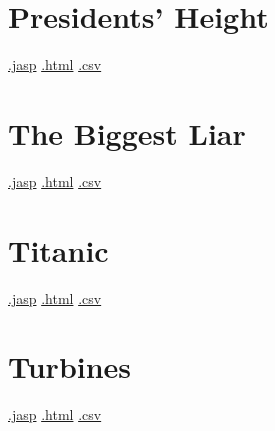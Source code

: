 \documentclass[
  letterpaper,
  DIV=11,
  numbers=noendperiod]{scrreprt}
\begin{document}
\hypertarget{presidents-height}{%
\section{Presidents' Height}\label{presidents-height}}

\textbar{}
\href{https://github.com/jasp-stats/jasp-data-library/raw/main/Presidents\textquotesingle{}\%20Height/Presidents\textquotesingle{}\%20Height.jasp}{.jasp}
\textbar{}
\href{https://htmlpreview.github.io/?https://github.com/jasp-stats/jasp-data-library/blob/main/Presidents\textquotesingle{}\%20Height/index.html}{.html}
\textbar{}
\href{https://raw.githubusercontent.com/jasp-stats/jasp-data-library/main/Presidents\textquotesingle{}\%20Height/Presidents\textquotesingle{}\%20Height.csv}{.csv}

\hypertarget{the-biggest-liar}{%
\section{The Biggest Liar}\label{the-biggest-liar}}

\textbar{}
\href{https://github.com/jasp-stats/jasp-data-library/raw/main/The\%20Biggest\%20Liar/The\%20Biggest\%20Liar.jasp}{.jasp}
\textbar{}
\href{https://htmlpreview.github.io/?https://github.com/jasp-stats/jasp-data-library/blob/main/The\%20Biggest\%20Liar/index.html}{.html}
\textbar{}
\href{https://raw.githubusercontent.com/jasp-stats/jasp-data-library/main/The\%20Biggest\%20Liar/The\%20Biggest\%20Liar.csv}{.csv}

\hypertarget{titanic}{%
\section{Titanic}\label{titanic}}

\textbar{}
\href{https://github.com/jasp-stats/jasp-data-library/raw/main/Titanic/Titanic.jasp}{.jasp}
\textbar{}
\href{https://htmlpreview.github.io/?https://github.com/jasp-stats/jasp-data-library/blob/main/Titanic/index.html}{.html}
\textbar{}
\href{https://raw.githubusercontent.com/jasp-stats/jasp-data-library/main/Titanic/Titanic.csv}{.csv}

\hypertarget{turbines}{%
\section{Turbines}\label{turbines}}

\textbar{}
\href{https://github.com/jasp-stats/jasp-data-library/raw/main/Turbines/Turbines.jasp}{.jasp}
\textbar{}
\href{https://htmlpreview.github.io/?https://github.com/jasp-stats/jasp-data-library/blob/main/Turbines/index.html}{.html}
\textbar{}
\href{https://raw.githubusercontent.com/jasp-stats/jasp-data-library/main/Turbines/Turbines.csv}{.csv}
\end{document}
